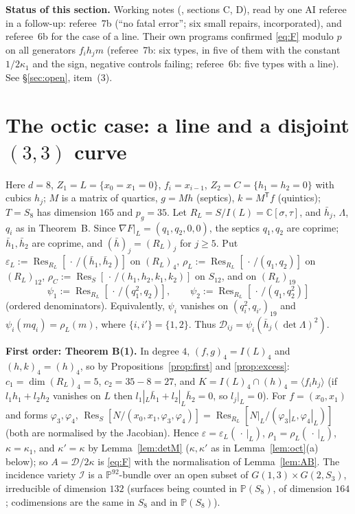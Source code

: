 \documentclass[11pt]{article}
\numberwithin{equation}{section}
\theoremstyle{remark}
\newcommand{\PP}{\mathbb{P}}
\newcommand{\CC}{\mathbb{C}}
\newcommand{\cD}{\mathcal{D}}
\newcommand{\cI}{\mathcal{I}}
\newcommand{\Res}{\operatorname{Res}}
\newcommand{\run}[1]{\medskip\noindent\textbf{#1}}
\begin{document}
\run{Status of this section.} Working notes (, sections C, D), read by one
AI referee in a follow-up: referee~7b (``no fatal error''; six small repairs, incorporated), and referee~6b
for the case of a line. Their own programs confirmed \eqref{eq:F} modulo $p$ on all generators $f_ih_jm$
(referee~7b: six types, in five of them with the constant $1/2\kappa_1$ and the sign, negative controls
failing; referee~6b: five types with a line). See \S\ref{sec:open}, item~(3).

\section{The octic case: a line and a disjoint \texorpdfstring{$(3,3)$}{(3,3)} curve}\label{sec:octic}

Here $d=8$, $Z_1=L=\{x_0=x_1=0\}$, $f_i=x_{i-1}$, $Z_2=C=\{h_1=h_2=0\}$ with cubics $h_j$; $M$ is a matrix of
quartics, $g=Mh$ (septics), $k=M^{\mathsf T}f$ (quintics); $T=S_8$ has dimension $165$ and $p_g=35$. Let
$R_L=S/I(L)=\CC[\sigma,\tau]$, and $\bar h_j$, $\Lambda$, $q_i$ as in Theorem~B. Since
$\nabla F|_L=(q_1,q_2,0,0)$, the septics $q_1,q_2$ are coprime; $\bar h_1,\bar h_2$ are coprime, and
$(\bar h)_j=(R_L)_j$ for $j\ge5$. Put $\varepsilon_L:=\Res_{R_L}[\,\cdot\,/(\bar h_1,\bar h_2)]$ on $(R_L)_4$,
$\rho_L:=\Res_{R_L}[\,\cdot\,/(q_1,q_2)]$ on $(R_L)_{12}$, $\rho_C:=\Res_S[\,\cdot\,/(h_1,h_2,k_1,k_2)]$ on
$S_{12}$, and on $(R_L)_{19}$
\[
\psi_1:=\Res_{R_L}[\,\cdot\,/(q_1^2,q_2)],\qquad\psi_2:=\Res_{R_L}[\,\cdot\,/(q_1,q_2^2)]
\]
(ordered denominators). Equivalently, $\psi_i$ vanishes on $(q_i^2,q_{i'})_{19}$ and $\psi_i(mq_i)=\rho_L(m)$,
where $\{i,i'\}=\{1,2\}$. Thus $\cD_{ij}=\psi_i(\bar h_j(\det\Lambda)^2)$.

\run{First order: Theorem B(1).} In degree $4$, $(f,g)_4=I(L)_4$ and $(h,k)_4=(h)_4$, so by
Propositions~\ref{prop:first} and \ref{prop:excess}: $c_1=\dim(R_L)_4=5$, $c_2=35-8=27$, and
$K=I(L)_4\cap(h)_4=\langle f_ih_j\rangle$ (if $l_1h_1+l_2h_2$ vanishes on $L$ then
$l_1|_L\bar h_1+l_2|_L\bar h_2=0$, so $l_j|_L=0$). For $f=(x_0,x_1)$ and forms $\varphi_3,\varphi_4$,
$\Res_S[N/(x_0,x_1,\varphi_3,\varphi_4)]=\Res_{R_L}[N|_L/(\varphi_3|_L,\varphi_4|_L)]$ (both are normalised by
the Jacobian). Hence $\varepsilon=\varepsilon_L(\,\cdot\,|_L)$, $\rho_1=\rho_L(\,\cdot\,|_L)$, $\kappa=\kappa_1$,
and $\kappa'=\kappa$ by Lemma~\ref{lem:detM} ($\kappa,\kappa'$ as in Lemma~\ref{lem:oct}(a) below); so
$A=\cD/2\kappa$ is \eqref{eq:F} with the normalisation of Lemma~\ref{lem:AB}. The incidence variety $\cI$ is a $\PP^{92}$-bundle over an
open subset of $G(1,3)\times G(2,S_3)$, irreducible of dimension $132$ (surfaces being counted in $\PP(S_8)$, of
dimension $164$; codimensions are the same in $S_8$ and in $\PP(S_8)$).
\end{document}
